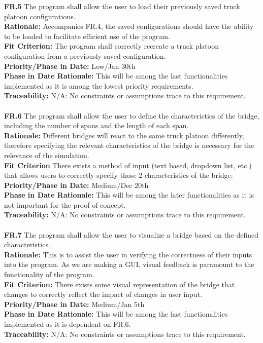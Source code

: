 \documentclass[12pt]{article}
\begin{document}
  \noindent\textbf{FR.5} The program shall allow the user to load their previously saved truck platoon configurations.\\
  \textbf{Rationale:} Accompanies FR.4, the saved configurations should have the ability to be loaded to facilitate efficient use of the program.\\
  \textbf{Fit Criterion:} The program shall correctly recreate a truck platoon configuration from a previously saved configuration.\\
  \textbf{Priority/Phase in Date:} Low/Jan 30th\\
  \textbf{Phase in Date Rationale:} This will be among the last functionalities implemented as it is among the lowest priority requirements.\\
  \textbf{Traceability:} N/A: No constraints or assumptions trace to this requirement.\\\\

  \noindent\textbf{FR.6} The program shall allow the user to define the characteristics of the bridge, including the number of spans and the length of each span.\\
  \textbf{Rationale:} Different bridges will react to the same truck platoon differently, therefore specifying the relevant characteristics of the bridge is necessary for
  the relevance of the simulation.\\
  \textbf{Fit Criterion} There exists a method of input (text based, dropdown list, etc.) that allows users to correctly specify those 2 characteristics of the bridge.\\
  \textbf{Priority/Phase in Date:} Medium/Dec 20th\\
  \textbf{Phase in Date Rationale:} This will be among the later functionalities as it is not important for the proof of concept.\\
  \textbf{Traceability:} N/A: No constraints or assumptions trace to this requirement.\\\\
  
  \noindent\textbf{FR.7} The program shall allow the user to visualize a bridge based on the defined characteristics.\\
  \textbf{Rationale:} This is to assist the user in verifying the correctness of their inputs into the program. As we are making a GUI, visual feedback is paramount to the functionality of the program.\\
  \textbf{Fit Criterion:} There exists some visual representation of the bridge that changes to correctly reflect the impact of changes in user input.\\
  \textbf{Priority/Phase in Date:} Medium/Jan 5th\\
  \textbf{Phase in Date Rationale:} This will be among the last functionalities implemented as it is dependent on FR.6.\\
  \textbf{Traceability:} N/A: No constraints or assumptions trace to this requirement.\\\\
  
\end{document}
